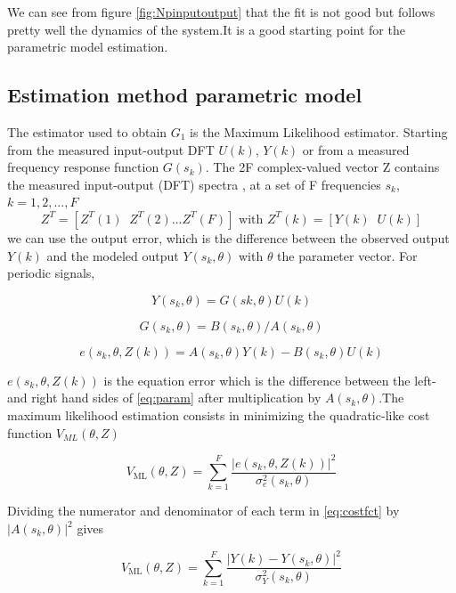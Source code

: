 \documentclass[a4paper,12pt]{report}
\numberwithin{equation}{section}
\begin{document}
\noindent
We can see from figure \ref{fig:Npinputoutput} that the fit is not good but follows pretty well the dynamics of the system.It is a good starting point for the parametric model estimation.

\subsection{Estimation method parametric model}
The estimator used to obtain $G_{1}$ is the Maximum Likelihood estimator. Starting from the measured input-output DFT $U(k)$, $Y(k)$ or from a measured frequency response function $G(s_{k})$. The 2F complex-valued vector Z contains the measured
input-output (DFT) spectra , at a set of F frequencies $s_{k}$, $k = 1, 2, ...,F$
 $$
Z^{T}=\left[Z^{T}(1)\;\; Z^{T}(2) \ldots Z^{T}(F)\right] \text { with } Z^{T}(k)=[Y(k)\;\; U(k)]
$$
\noindent
we can use the output error, which is the difference between the observed output $Y(k)$ and the modeled output $Y(s_{k},\theta)$ with $\theta$ the parameter vector. For periodic signals,

\begin{equation}\label{eq:param}
Y\left(s_{k}, \theta\right)=G\left(s{k}, \theta\right) U(k)
\end{equation}

$$
G(s_{k}, \theta)=B(s_{k}, \theta) / A(s_{k}, \theta)
$$

$$
e\left(s_{k}, \theta, Z(k)\right)=A\left(s_{k}, \theta\right) Y(k)-B\left(s_{k}, \theta\right) U(k)
$$

\noindent
$e\left(s_{k}, \theta, Z(k)\right)$ is the equation error  which is the difference between the left- and right hand sides of \ref{eq:param}  after multiplication by $A\left(s_{k}, \theta\right)$.The maximum likelihood estimation consists in minimizing the  quadratic-like cost function $V_{ML}(\theta
, Z)$

\begin{equation}\label{eq:costfct}
V_{\mathrm{ML}}(\theta, Z)=\sum_{k=1}^{F} \frac{\left|e\left(s_{k}, \theta, Z(k)\right)\right|^{2}}{\sigma_{e}^{2}\left(s_{k}, \theta\right)}
\end{equation}

Dividing the numerator and denominator of each term in \ref{eq:costfct} by $\left|A\left(s_{k}, \theta\right)\right|^{2}$ gives

\begin{equation}\label{eq:costfctML}
V_{\mathrm{ML}}(\theta, Z)=\sum_{k=1}^{F} \frac{\left|Y(k)-Y\left(s_{k}, \theta\right)\right|^{2}}{\sigma_{Y}^{2}\left(s_{k}, \theta\right)}
\end{equation}
\end{document}

